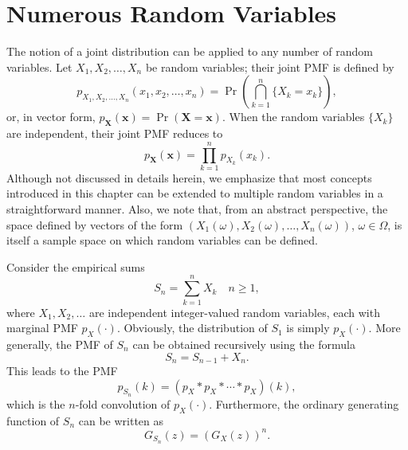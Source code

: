 \section{Numerous Random Variables}

The notion of a joint distribution can be applied to any number of random variables.
Let $X_1, X_2, \ldots, X_n$ be random variables; their joint PMF is defined by
\begin{equation*}
p_{X_1, X_2, \ldots, X_n} (x_1, x_2, \ldots, x_n) = \Pr \left( \bigcap_{k=1}^n \{ X_k = x_k \} \right),
\end{equation*}
or, in vector form, $p_{\mathbf{X}} (\mathbf{x}) = \Pr ( \mathbf{X} = \mathbf{x} )$.
When the random variables $\{ X_k \}$ are independent, their joint PMF reduces to
\begin{equation*}
p_{\mathbf{X}} (\mathbf{x}) = \prod_{k=1}^n p_{X_k} (x_k) .
\end{equation*}
Although not discussed in details herein, we emphasize that most concepts introduced in this chapter can be extended to multiple random variables in a straightforward manner.
Also, we note that, from an abstract perspective, the space defined by vectors of the form $( X_1 (\omega), X_2 (\omega), \ldots, X_n (\omega) )$, $\omega \in \Omega$, is itself a sample space on which random variables can be defined.

Consider the empirical sums
\begin{equation*}
S_n = \sum_{k=1}^n X_k \quad n \geq 1 ,
\end{equation*}
where $X_1, X_2, \ldots$ are independent integer-valued random variables, each with marginal PMF $p_X (\cdot)$.
Obviously, the distribution of $S_1$ is simply $p_X (\cdot)$.
More generally, the PMF of $S_n$ can be obtained recursively using the formula
\begin{equation*}
S_n = S_{n-1} + X_n .
\end{equation*}
This leads to the PMF
\begin{equation*}
p_{S_n} (k) = (p_X \ast p_X \ast \cdots \ast p_X ) (k) ,
\end{equation*}
which is the $n$-fold convolution of $p_X (\cdot)$.
Furthermore, the ordinary generating function of $S_n$ can be written as
\begin{equation*}
G_{S_n} (z) = \left( G_X (z) \right)^n.
\end{equation*}

